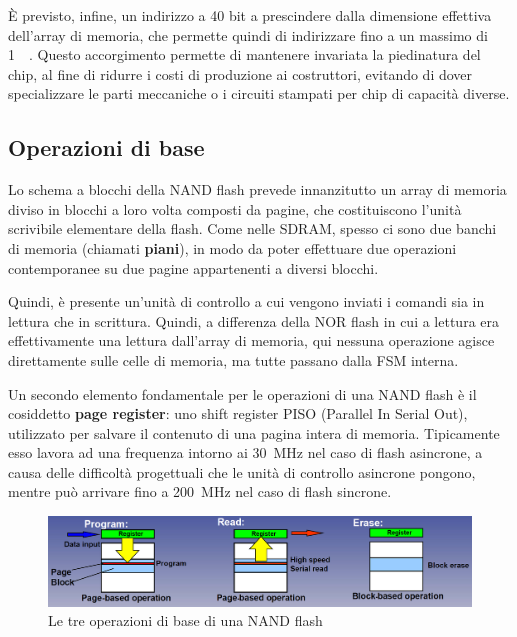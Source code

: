 \documentclass[11pt,4paper]{report}
\begin{document}
È previsto, infine, un indirizzo a 40 bit a prescindere dalla dimensione effettiva dell'array di memoria, che permette quindi di indirizzare fino a un massimo di \SI{1}{\tera\byte}. Questo accorgimento permette di mantenere invariata la piedinatura del chip, al fine di ridurre i costi di produzione ai costruttori, evitando di dover specializzare le parti meccaniche o i circuiti stampati per chip di capacità diverse. 

\subsection{Operazioni di base}\label{sec:nand_ops}
Lo schema a blocchi della NAND flash prevede innanzitutto un array di memoria diviso in blocchi a loro volta composti da pagine, che costituiscono l'unità scrivibile elementare della flash. Come nelle SDRAM, spesso ci sono due banchi di memoria (chiamati \textbf{piani}), in modo da poter effettuare due operazioni contemporanee su due pagine appartenenti a diversi blocchi. 

Quindi, è presente un'unità di controllo a cui vengono inviati i comandi sia in lettura che in scrittura. Quindi, a differenza della NOR flash in cui a lettura era effettivamente una lettura dall'array di memoria, qui nessuna operazione agisce direttamente sulle celle di memoria, ma tutte passano dalla FSM interna.

Un secondo elemento fondamentale per le operazioni di una NAND flash è il cosiddetto \textbf{page register}: uno shift register PISO (Parallel In Serial Out), utilizzato per salvare il contenuto di una pagina intera di memoria. Tipicamente esso lavora ad una frequenza intorno ai \SI{30}{\mega\hertz} nel caso di flash asincrone, a causa delle difficoltà progettuali che le unità di controllo asincrone pongono, mentre può arrivare fino a \SI{200}{\mega\hertz} nel caso di flash sincrone.

\begin{figure}[hbtp]
	\centering
	\includegraphics[width=\textwidth]{memorie/jc_operations}
	\caption{Le tre operazioni di base di una NAND flash}
	\label{fig:jc_operations}
\end{figure}
\end{document}
